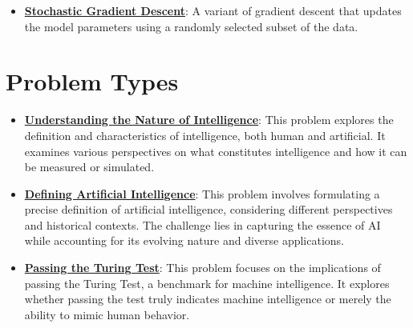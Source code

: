 \documentclass{article}%
\begin{document}
\begin{itemize}[leftmargin=*]
\item \href{https://purdue.brightspace.com/d2l/common/assets/pdfjs-d2l-dist/1.0.14-legacy/web/viewer.html?file=\%2Fcontent\%2Fenforced\%2F1095467-wl.202510.CS.24300.001\%2F05L2-ML Basics.pdf\%3Fou\%3D1095467\&lang=en-us\&container=d2l-fileviewer-rendered-pdf\&fullscreen=d2l-fileviewer-rendered-pdf-dialog\&height=667#page=29}{\textbf{Stochastic Gradient Descent}}: A variant of gradient descent that updates the model parameters using a randomly selected subset of the data.%
\end{itemize}

%
\section{Problem Types}%
\label{sec:ProblemTypes}%
\begin{itemize}[leftmargin=*]%
\item \href{https://purdue.brightspace.com/d2l/common/assets/pdfjs-d2l-dist/1.0.14-legacy/web/viewer.html?file=\%2Fcontent\%2Fenforced\%2F1095467-wl.202510.CS.24300.001\%2F02L2-Intro.pdf\%3Fou\%3D1095467\&lang=en-us\&container=d2l-fileviewer-rendered-pdf\&fullscreen=d2l-fileviewer-rendered-pdf-dialog\&height=667#page=5}{\textbf{Understanding the Nature of Intelligence}}: This problem explores the definition and characteristics of intelligence, both human and artificial. It examines various perspectives on what constitutes intelligence and how it can be measured or simulated.%
\item \href{https://purdue.brightspace.com/d2l/common/assets/pdfjs-d2l-dist/1.0.14-legacy/web/viewer.html?file=\%2Fcontent\%2Fenforced\%2F1095467-wl.202510.CS.24300.001\%2F02L2-Intro.pdf\%3Fou\%3D1095467\&lang=en-us\&container=d2l-fileviewer-rendered-pdf\&fullscreen=d2l-fileviewer-rendered-pdf-dialog\&height=667#page=5}{\textbf{Defining Artificial Intelligence}}: This problem involves formulating a precise definition of artificial intelligence, considering different perspectives and historical contexts. The challenge lies in capturing the essence of AI while accounting for its evolving nature and diverse applications.%
\item \href{https://purdue.brightspace.com/d2l/common/assets/pdfjs-d2l-dist/1.0.14-legacy/web/viewer.html?file=\%2Fcontent\%2Fenforced\%2F1095467-wl.202510.CS.24300.001\%2F02L2-Intro.pdf\%3Fou\%3D1095467\&lang=en-us\&container=d2l-fileviewer-rendered-pdf\&fullscreen=d2l-fileviewer-rendered-pdf-dialog\&height=667#page=6}{\textbf{Passing the Turing Test}}: This problem focuses on the implications of passing the Turing Test, a benchmark for machine intelligence. It explores whether passing the test truly indicates machine intelligence or merely the ability to mimic human behavior.%

\end{itemize}
\end{document}
